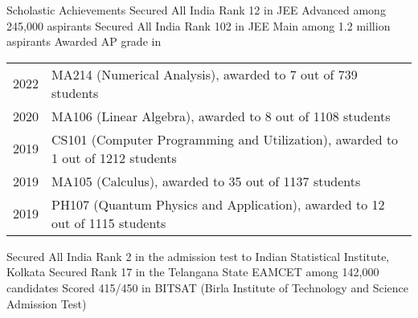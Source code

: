 
\begin{rubric}{Scholastic Achievements}
    \entry*[2019] Secured All India Rank 12 in JEE Advanced among 245,000 aspirants
    \entry*[2019\phantom{}] Secured All India Rank 102 in JEE Main among 1.2 million aspirants
    \entry* Awarded AP grade in
        
        \begin{tabular}{@{}ll}
           2022 & MA214 (Numerical Analysis), awarded to 7 out of 739 students \\
           2020 & MA106 (Linear Algebra), awarded to 8 out of 1108 students \\
           2019 & CS101 (Computer Programming and Utilization), awarded to 1 out of 1212 students \\
           2019 & MA105 (Calculus), awarded to 35 out of 1137 students \\
           2019 & PH107 (Quantum Physics and Application), awarded to 12 out of 1115 students \\
        \end{tabular}
    \entry*[2019] Secured All India Rank 2 in the admission test to Indian Statistical Institute, Kolkata
    \entry*[2019\phantom{}] Secured Rank 17 in the Telangana State EAMCET among 142,000 candidates
    \entry*[2019] Scored 415/450 in BITSAT (Birla Institute of Technology and Science Admission Test)
\end{rubric}